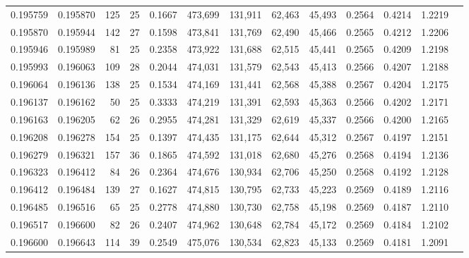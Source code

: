 \begin{tabular}{rrrrrrrrrrrrr}
0.195759 & 0.195870 & 125 &  25 &                                     0.1667 & 473,699 & 131,911 &  62,463 &  45,493 & 0.2564 & 0.4214 & 1.2219 \\
0.195870 & 0.195944 & 142 &  27 &                                     0.1598 & 473,841 & 131,769 &  62,490 &  45,466 & 0.2565 & 0.4212 & 1.2206 \\
0.195946 & 0.195989 &  81 &  25 &                                     0.2358 & 473,922 & 131,688 &  62,515 &  45,441 & 0.2565 & 0.4209 & 1.2198 \\
0.195993 & 0.196063 & 109 &  28 &                                     0.2044 & 474,031 & 131,579 &  62,543 &  45,413 & 0.2566 & 0.4207 & 1.2188 \\
0.196064 & 0.196136 & 138 &  25 &                                     0.1534 & 474,169 & 131,441 &  62,568 &  45,388 & 0.2567 & 0.4204 & 1.2175 \\
0.196137 & 0.196162 &  50 &  25 &                                     0.3333 & 474,219 & 131,391 &  62,593 &  45,363 & 0.2566 & 0.4202 & 1.2171 \\
0.196163 & 0.196205 &  62 &  26 &                                     0.2955 & 474,281 & 131,329 &  62,619 &  45,337 & 0.2566 & 0.4200 & 1.2165 \\
0.196208 & 0.196278 & 154 &  25 &                                     0.1397 & 474,435 & 131,175 &  62,644 &  45,312 & 0.2567 & 0.4197 & 1.2151 \\
0.196279 & 0.196321 & 157 &  36 &                                     0.1865 & 474,592 & 131,018 &  62,680 &  45,276 & 0.2568 & 0.4194 & 1.2136 \\
0.196323 & 0.196412 &  84 &  26 &                                     0.2364 & 474,676 & 130,934 &  62,706 &  45,250 & 0.2568 & 0.4192 & 1.2128 \\
0.196412 & 0.196484 & 139 &  27 &                                     0.1627 & 474,815 & 130,795 &  62,733 &  45,223 & 0.2569 & 0.4189 & 1.2116 \\
0.196485 & 0.196516 &  65 &  25 &                                     0.2778 & 474,880 & 130,730 &  62,758 &  45,198 & 0.2569 & 0.4187 & 1.2110 \\
0.196517 & 0.196600 &  82 &  26 &                                     0.2407 & 474,962 & 130,648 &  62,784 &  45,172 & 0.2569 & 0.4184 & 1.2102 \\
0.196600 & 0.196643 & 114 &  39 &                                     0.2549 & 475,076 & 130,534 &  62,823 &  45,133 & 0.2569 & 0.4181 & 1.2091 \\

\end{tabular}
